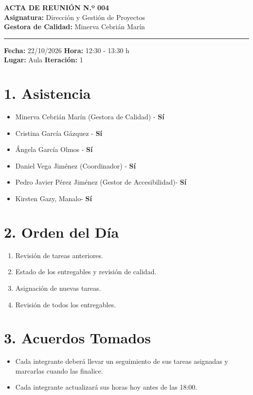 
\begin{center}
    {\Large \textbf{ACTA DE REUNIÓN N.º 004}}\\[0.2cm]
    \textbf{Asignatura:} Dirección y Gestión de Proyectos\\
    \textbf{Gestora de Calidad:} Minerva Cebrián Marín
\end{center}

\vspace{0.3cm}
\hrule
\vspace{0.4cm}

\noindent \textbf{Fecha:} 22/10/2026 \hfill \textbf{Hora:} 12:30 - 13:30 h\\
\noindent \textbf{Lugar:} Aula  \hfill \textbf{Iteración:} 1

\vspace{0.4cm}

\section*{1. Asistencia}
\begin{itemize}
    \item Minerva Cebrián Marín (Gestora de Calidad) - \textbf{Sí}
    \item Cristina García Gázquez  - \textbf{Sí}
    \item Ángela García Olmos  - \textbf{Sí}
    \item Daniel Vega Jiménez (Coordinador) - \textbf{Sí}
    \item Pedro Javier Pérez Jiménez (Gestor de Accesibilidad)- \textbf{Sí}
    \item Kirsten Gazy, Manalo- \textbf{Sí}

\end{itemize}



\section*{2. Orden del Día}
\begin{enumerate}
    \item Revisión de tareas anteriores.
    \item Estado de los entregables y revisión de calidad.
    \item Asignación de nuevas tareas.
    \item Revisión de todos los entregables.
\end{enumerate}

\section*{3. Acuerdos Tomados}
\begin{itemize}
    \item Cada integrante deberá llevar un seguimiento de sus tareas asignadas y marcarlas cuando las finalice.
    \item Cada integrante actualizará sus horas hoy antes de las 18:00.

\end{itemize}

